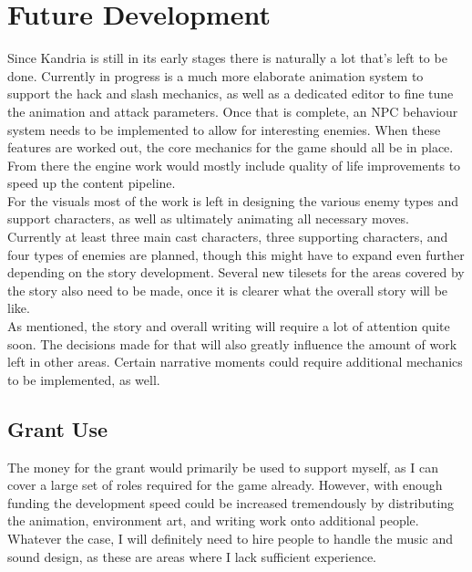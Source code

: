 \section{Future Development}\label{sec:future}
Since Kandria is still in its early stages there is naturally a lot that's left to be done. Currently in progress is a much more elaborate animation system to support the hack and slash mechanics, as well as a dedicated editor to fine tune the animation and attack parameters. Once that is complete, an NPC behaviour system needs to be implemented to allow for interesting enemies. When these features are worked out, the core mechanics for the game should all be in place. From there the engine work would mostly include quality of life improvements to speed up the content pipeline. \\

For the visuals most of the work is left in designing the various enemy types and support characters, as well as ultimately animating all necessary moves. Currently at least three main cast characters, three supporting characters, and four types of enemies are planned, though this might have to expand even further depending on the story development. Several new tilesets for the areas covered by the story also need to be made, once it is clearer what the overall story will be like. \\

As mentioned, the story and overall writing will require a lot of attention quite soon. The decisions made for that will also greatly influence the amount of work left in other areas. Certain narrative moments could require additional mechanics to be implemented, as well.

\subsection{Grant Use}
The money for the grant would primarily be used to support myself, as I can cover a large set of roles required for the game already. However, with enough funding the development speed could be increased tremendously by distributing the animation, environment art, and writing work onto additional people. Whatever the case, I will definitely need to hire people to handle the music and sound design, as these are areas where I lack sufficient experience.

